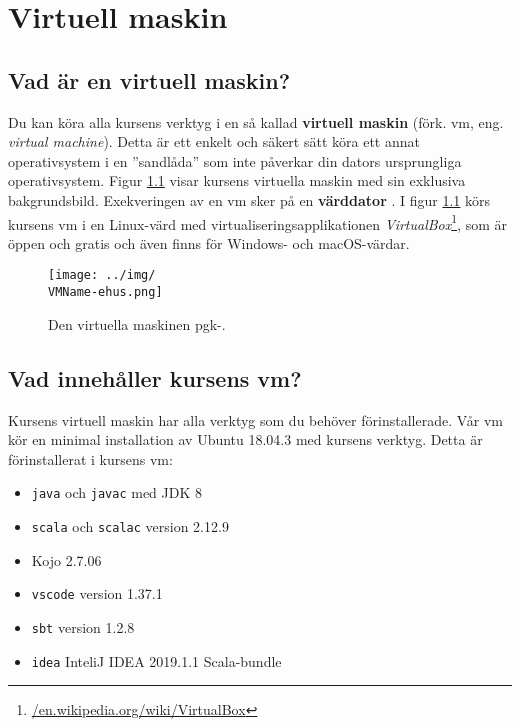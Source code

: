
\chapter{Virtuell maskin}\label{appendix:vbox}

\section{Vad är en virtuell maskin?}

Du kan köra alla kursens verktyg i en så kallad \textbf{virtuell maskin} (förk. vm, eng. \textit{virtual machine}). 
Detta är ett enkelt och säkert sätt köra ett annat operativsystem i en ''sandlåda'' som inte påverkar din dators ursprungliga operativsystem. Figur \ref{fig:vm} visar kursens virtuella maskin med sin exklusiva bakgrundsbild. Exekveringen av en vm sker på en \textbf{värddator} . I figur \ref{fig:vm} körs kursens vm i en Linux-värd med virtualiseringsapplikationen \textit{VirtualBox}\footnote{\href{https://en.wikipedia.org/wiki/VirtualBox}{/en.wikipedia.org/wiki/VirtualBox}}, som är öppen och gratis och även finns för Windows- och macOS-värdar. 



\begin{figure}[H]
\centering
\texttt{[image: ../img/\\VMName-ehus.png]}
\caption{Den virtuella maskinen pgk-\VMName.}
\label{fig:vm}
\end{figure}


\section{Vad innehåller kursens vm?}

Kursens virtuell maskin har alla verktyg som du behöver förinstallerade.  Vår vm kör en minimal installation av Ubuntu 18.04.3 med kursens verktyg. Detta är förinstallerat i kursens vm:

\begin{itemize}
\item \texttt{java} och \texttt{javac} med JDK 8
\item \texttt{scala} och \texttt{scalac} version 2.12.9
\item Kojo 2.7.06
\item \texttt{vscode} version 1.37.1
\item \texttt{sbt} version 1.2.8
\item \texttt{idea} InteliJ IDEA 2019.1.1 Scala-bundle
\end{itemize}

